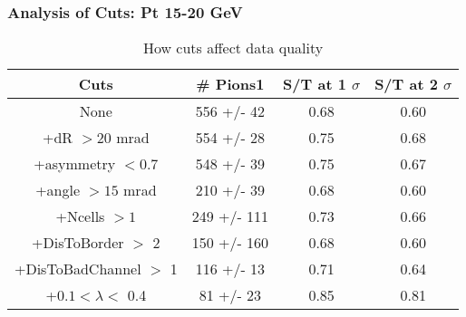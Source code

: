 \frame
{
\frametitle{Analysis of Cuts: Pt 15-20 GeV}
\begin{table}
\caption{How cuts affect data quality}
\centering
\begin{tabular}{c c c c}
\hline\hline
Cuts & \# Pions1 & S/T at 1 $\sigma$ & S/T at 2 $\sigma$ \\ [0.5ex]
\hline
None &  556 +/-   42 & 0.68 & 0.60 \\ %
+dR $> 20$ mrad &  554 +/-   28 & 0.75 & 0.68 \\ %
+asymmetry $< 0.7$ &  548 +/-   39 & 0.75 & 0.67 \\ %
+angle $> 15$ mrad &  210 +/-   39 & 0.68 & 0.60 \\ %
+Ncells $> 1$&  249 +/-  111 & 0.73 & 0.66 \\ %
+DisToBorder $>$ 2 &  150 +/-  160 & 0.68 & 0.60 \\ %
+DisToBadChannel $>$ 1&  116 +/-   13 & 0.71 & 0.64 \\ %
+$0.1 < \lambda <$ 0.4 &   81 +/-   23 & 0.85 & 0.81 \\ %
[1ex]
\hline
\end{tabular}
\label{table:nonlin}
\end{table}
}
